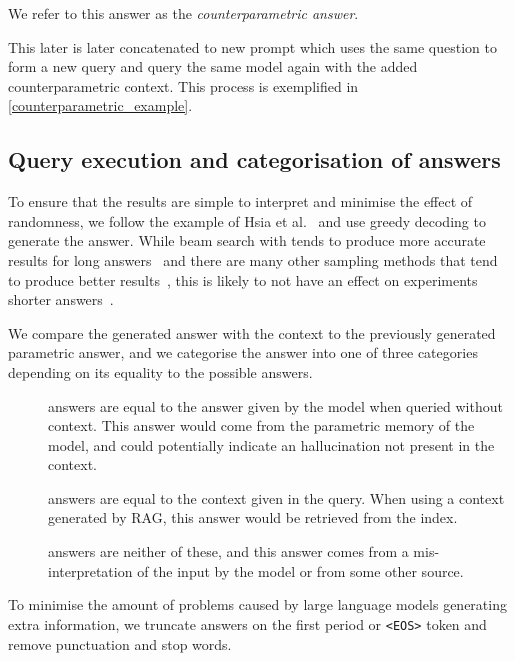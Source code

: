 We refer to this answer as the \emph{counterparametric answer}.

This later is later concatenated to new prompt which uses the same question to form a new query and query the same model again with the added counterparametric context.
This process is exemplified in \cref{counterparametric_example}.

\subsection{Query execution and categorisation of answers}

To ensure that the results are simple to interpret and minimise the effect of randomness, we follow the example of Hsia et al.~\cite{ragged} and use greedy decoding to generate the answer.
While beam search with tends to produce more accurate results for long answers~\cite{sutskever_seq2seqlearning,wu_mltranslation} and there are many other sampling methods that tend to produce better results~\cite{text_degeneration}, this is likely to not have an effect on experiments shorter answers~\cite{t5}.

We compare the generated answer with the context to the previously generated parametric answer, and we categorise the answer into one of three categories depending on its equality to the possible answers.

\begin{description}
	\item[\Parametric{}] answers are equal to the answer given by the model when queried without context.
		This answer would come from the parametric memory of the model, and could potentially indicate an hallucination not present in the context.
	\item[\Contextual{}] answers are equal to the context given in the query.
		When using a context generated by RAG, this answer would be retrieved from the index.
	\item[\Other] answers are neither of these, and this answer comes from a mis-interpretation of the input by the model or from some other source.
\end{description}

To minimise the amount of problems caused by large language models generating extra information, we truncate answers on the first period or \texttt{<EOS>} token and remove punctuation and stop words.

